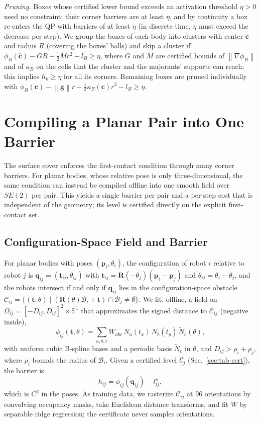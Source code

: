 \documentclass[journal]{IEEEtran}
\theoremstyle{definition}
\newcommand{\Sone}{\mathbb{S}^1}
\newcommand{\norm}[1]{\left\lVert #1\right\rVert}
\newcommand{\CO}{\mathcal{C}}
\newcommand{\Rot}{\mathbf{R}}
\begin{document}
\emph{Pruning.} Boxes whose certified lower bound exceeds an activation threshold $\eta>0$ need no
constraint: their corner barriers are at least $\eta$, and by continuity a box re-enters the QP with
barriers of at least $\eta$ (in discrete time, $\eta$ must exceed the decrease per step). We group the boxes of
each body into clusters with center $\bar{\mathbf c}$ and radius $R$ (covering the boxes' balls) and
skip a cluster if $\phi_B(\bar{\mathbf c})-GR-\tfrac12\bar M r^2-l_B\ge\eta$, where $G$ and $\bar M$
are certified bounds of $\norm{\nabla\phi_B}$ and of $\kappa_B$ on the cells that the cluster and the
majorants' supports can reach; this implies $h_k\ge\eta$ for all its corners. Remaining boxes are
pruned individually with $\phi_B(\mathbf c)-\norm{\mathbf g}r-\tfrac12\kappa_B(\mathbf c)r^2-l_B\ge\eta$.

\section{Compiling a Planar Pair into One Barrier}\label{sec:tab}
The surface cover enforces the first-contact condition through many corner barriers. For planar
bodies, whose relative pose is only three-dimensional, the same condition can instead be compiled
offline into one smooth field over $SE(2)$ per pair. This yields a single barrier per pair and a
per-step cost that is independent of the geometry; its level is certified directly on the explicit
first-contact set.

\subsection{Configuration-Space Field and Barrier}
For planar bodies with poses $(\mathbf p_i,\theta_i)$, the configuration of robot $i$ relative to
robot $j$ is $\mathbf q_{ij}=(\mathbf t_{ij},\theta_{ij})$ with
$\mathbf t_{ij}=\Rot(-\theta_j)(\mathbf p_i-\mathbf p_j)$ and $\theta_{ij}=\theta_i-\theta_j$, and
the robots intersect if and only if $\mathbf q_{ij}$ lies in the configuration-space obstacle
$\CO_{ij}=\{(\mathbf t,\theta)\mid(\Rot(\theta)\mathcal B_i+\mathbf t)\cap\mathcal B_j\neq\emptyset\}$.
We fit, offline, a field on $\Omega_{ij}=[-D_{ij},D_{ij}]^2\times\Sone$ that approximates the signed
distance to $\CO_{ij}$ (negative inside),
\begin{equation}\label{eq:field}
\phi_{ij}(\mathbf t,\theta)=\textstyle\sum_{a,b,c}W_{abc}\,N_a(t_x)\,N_b(t_y)\,\tilde N_c(\theta),
\end{equation}
with uniform cubic B-spline bases and a periodic basis $\tilde N_c$ in $\theta$, and
$D_{ij}>\rho_i+\rho_j$, where $\rho_i$ bounds the radius of $\mathcal B_i$. Given a certified level
$l^\star_{ij}$ (Sec.~\ref{sec:tab-cert}), the barrier is
\begin{equation}\label{eq:h}
h_{ij}=\phi_{ij}(\mathbf q_{ij})-l^\star_{ij},
\end{equation}
which is $C^2$ in the poses. As training data, we rasterize $\CO_{ij}$ at 96 orientations by
convolving occupancy masks, take Euclidean distance transforms, and fit $W$ by separable ridge
regression; the certificate never samples orientations.
\end{document}
